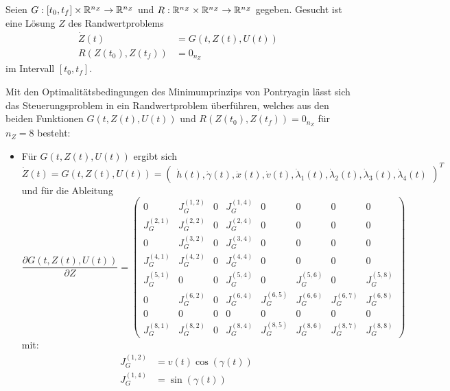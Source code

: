 \begin{problem}\label{prob:ZweiRand}
Seien $G : [t_0,t_f] \times \mathbb{R}^{n_Z} \to \mathbb{R}^{n_Z}$ und $R : \mathbb{R}^{n_Z} \times \mathbb{R}^{n_Z} \to \mathbb{R}^{n_Z}$ gegeben. Gesucht ist eine Lösung $Z$ des Randwertproblems
\begin{align}
\dot{Z}(t) &= G(t,Z(t),U(t)) \\
R(Z(t_0),Z(t_f)) &= 0_{n_Z}
\end{align}
im Intervall $[t_0,t_f]$.
\end{problem}

Mit den Optimalitätsbedingungen des Minimumprinzips von Pontryagin lässt sich das Steuerungsproblem in ein Randwertproblem überführen, welches aus den beiden Funktionen $G(t,Z(t),U(t))$ und $R(Z(t_0),Z(t_f)) = 0_{n_Z}$ für $n_Z = 8$ besteht:
\begin{itemize}
\item Für $G(t,Z(t),U(t))$ ergibt sich
\begin{equation}
\dot{Z}(t) = G(t,Z(t),U(t)) = \begin{pmatrix}
\dot{h}(t),\dot{\gamma}(t),\dot{x}(t),\dot{v}(t),\dot{\lambda}_1(t),\dot{\lambda}_2(t),\dot{\lambda}_3(t),\dot{\lambda}_4(t)
\end{pmatrix}^T
\end{equation}
und für die Ableitung
\begin{equation}
\dfrac{\partial G(t,Z(t),U(t))}{\partial Z} = \begin{pmatrix}
0 & J_G^{(1,2)} & 0 & J_G^{(1,4)} & 0 & 0 & 0 & 0 \\ 
J_G^{(2,1)} & J_G^{(2,2)} & 0 & J_G^{(2,4)} & 0 & 0 & 0 & 0 \\ 
0 & J_G^{(3,2)} & 0 & J_G^{(3,4)} & 0 & 0 & 0 & 0 \\ 
J_G^{(4,1)} & J_G^{(4,2)} & 0 & J_G^{(4,4)} & 0 & 0 & 0 & 0 \\
J_G^{(5,1)} & 0 & 0 & J_G^{(5,4)} & 0 & J_G^{(5,6)} & 0 & J_G^{(5,8)} \\
0 & J_G^{(6,2)} & 0 & J_G^{(6,4)} & J_G^{(6,5)} & J_G^{(6,6)} & J_G^{(6,7)} & J_G^{(6,8)} \\
0 & 0 & 0 & 0 & 0 & 0 & 0 & 0 \\
J_G^{(8,1)} & J_G^{(8,2)} & 0 & J_G^{(8,4)} & J_G^{(8,5)} & J_G^{(8,6)} & J_G^{(8,7)} & J_G^{(8,8)}
\end{pmatrix}
\end{equation}
mit:
\begin{align}
J_G^{(1,2)} &= v(t) \cos(\gamma(t)) \\
J_G^{(1,4)} &= \sin(\gamma(t)) \\

\end{align}
\end{itemize}
